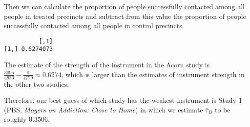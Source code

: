 \documentclass[
  12pt,
  leqno]{article}
\newenvironment{Shaded}{\begin{snugshade}}{\end{snugshade}}
\newcommand{\DecValTok}[1]{\textcolor[rgb]{0.00,0.00,0.81}{#1}}
\newcommand{\KeywordTok}[1]{\textcolor[rgb]{0.13,0.29,0.53}{\textbf{#1}}}
\newcommand{\NormalTok}[1]{#1}
\newcommand{\OperatorTok}[1]{\textcolor[rgb]{0.81,0.36,0.00}{\textbf{#1}}}
\newcommand{\StringTok}[1]{\textcolor[rgb]{0.31,0.60,0.02}{#1}}
\DeclareMathOperator{\1}{\mathbbm{1}}
\begin{document}
\normalsize

Then we can calculate the proportion of people successfully contacted
among all people in treated precincts and subtract from this value the
proportion of people successfully contacted among all people in control
precincts.

\scriptsize

\begin{Shaded}
\end{Shaded}

\begin{verbatim}
          [,1]
[1,] 0.6274073
\end{verbatim}

\normalsize

The estimate of the strength of the instrument in the Acorn study
\citep{arceneaux2005} is
\(\frac{3095}{4933} - \frac{0}{4779} \approx 0.6274\), which is larger
than the estimates of instrument strength in the other two studies.

Therefore, our best guess of which study has the weakest instrument is
Study 1 (PBS, \textit{Moyers on Addiction: Close to Home}) in which we
estimate \(\bar{\tau}_D\) to be roughly \(0.3506\).

\newpage

\renewcommand\refname{References}
  
\end{document}
